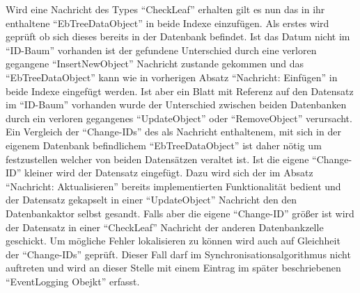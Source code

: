 \documentclass[a4paper,11pt,oneside,%
headsepline,												%
footsepline,												%
bibtotocnumbered									%
]{scrreprt}
\begin{document}
Wird eine Nachricht des Types \enquote{CheckLeaf} erhalten gilt es nun das in ihr enthaltene \enquote{EbTreeDataObject} in beide Indexe einzufügen. Als erstes wird geprüft ob sich dieses bereits in der Datenbank befindet. Ist das Datum nicht im \enquote{ID-Baum} vorhanden ist der gefundene Unterschied durch eine verloren gegangene \enquote{InsertNewObject} Nachricht zustande gekommen und das \enquote{EbTreeDataObject} kann wie in vorherigen Absatz \enquote{Nachricht: Einfügen} in beide Indexe eingefügt werden.
Ist aber ein Blatt mit Referenz auf den Datensatz im \enquote{ID-Baum} vorhanden wurde der Unterschied zwischen beiden Datenbanken durch ein verloren gegangenes \enquote{UpdateObject} oder \enquote{RemoveObject} verursacht. Ein Vergleich der \enquote{Change-IDs} des als Nachricht enthaltenem, mit sich in der eigenem Datenbank befindlichem \enquote{EbTreeDataObject} ist daher nötig um festzustellen welcher von beiden Datensätzen veraltet ist. Ist die eigene \enquote{Change-ID} kleiner wird der Datensatz eingefügt. Dazu wird sich der im Absatz \enquote{Nachricht: Aktualisieren} bereits implementierten Funktionalität bedient und der Datensatz gekapselt in einer \enquote{UpdateObject} Nachricht den den Datenbankaktor selbst gesandt. Falls aber die eigene \enquote{Change-ID} größer ist wird der Datensatz in einer \enquote{CheckLeaf} Nachricht der anderen Datenbankzelle geschickt. Um mögliche Fehler lokalisieren zu können wird auch auf Gleichheit der \enquote{Change-IDs} geprüft. Dieser Fall darf im Synchronisationsalgorithmus nicht auftreten und wird an dieser Stelle mit einem Eintrag im später beschriebenen \enquote{EventLogging Obejkt} erfasst.
\end{document}
